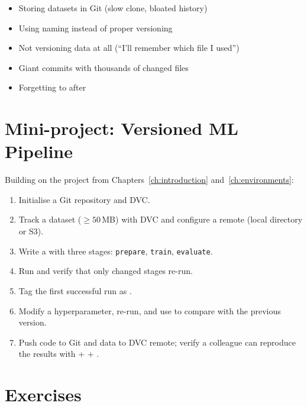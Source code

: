\begin{antipattern}[title=\textbf{Common anti-patterns}]
\begin{itemize}
  \item Storing datasets in Git (slow clone, bloated history)
  \item Using  naming instead of proper
    versioning
  \item Not versioning data at all (``I'll remember which file I used'')
  \item Giant commits with thousands of changed files
  \item Forgetting to  after 
\end{itemize}
\end{antipattern}

\section{Mini-project: Versioned ML Pipeline}
\label{sec:mini-project-ch3}

\begin{miniproject}[title=\textbf{Mini-project 3: Git + DVC pipeline}]
Building on the project from Chapters~\ref{ch:introduction}
and~\ref{ch:environments}:
\begin{enumerate}
  \item Initialise a Git repository and DVC.
  \item Track a dataset ($\ge 50$\,MB) with DVC and configure a remote
    (local directory or S3).
  \item Write a  with three stages: \texttt{prepare},
    \texttt{train}, \texttt{evaluate}.
  \item Run  and verify that only changed stages re-run.
  \item Tag the first successful run as .
  \item Modify a hyperparameter, re-run, and use 
    to compare with the previous version.
  \item Push code to Git and data to DVC remote; verify a colleague can
    reproduce the results with  +  +
    .
\end{enumerate}
\end{miniproject}

\section{Exercises}
\label{sec:exercises-ch3}


